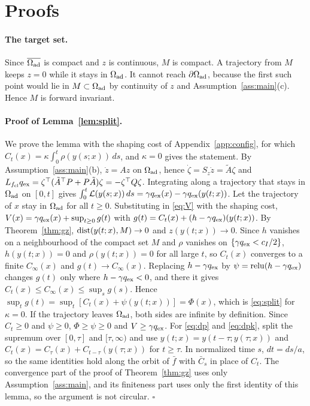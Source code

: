 \section{Proofs}\label{app:proofs}

\paragraph{The target set.} Since $\overline{\Omega_{\mathrm{ad}}}$ is compact and $z$ is continuous, $M$ is compact. A trajectory from $M$ keeps $z=0$ while it stays in $\Omega_{\mathrm{ad}}$. It cannot reach $\partial\Omega_{\mathrm{ad}}$, because the first such point would lie in $M\subset\Omega_{\mathrm{ad}}$ by continuity of $z$ and Assumption~\ref{ass:main}(c). Hence $M$ is forward invariant.

\paragraph{Proof of Lemma~\ref{lem:split}.} We prove the lemma with the shaping cost of Appendix~\ref{app:config}, for which $C_t(x)=\kappa\int_0^t\rho(y(s;x))\,ds$, and $\kappa=0$ gives the statement. By Assumption~\ref{ass:main}(b), $\dot z=Az$ on $\Omega_{\mathrm{ad}}$, hence $\dot\zeta=S_z\dot z=\tilde A\zeta$ and $L_{f_{\mathrm{cl}}}q_{\mathrm{ex}}=\zeta^\top(\tilde A^\top P+P\tilde A)\zeta=-\zeta^\top Q\zeta$. Integrating along a trajectory that stays in $\Omega_{\mathrm{ad}}$ on $[0,t]$ gives $\int_0^t\mathcal L(y(s;x))\,ds=\gamma q_{\mathrm{ex}}(x)-\gamma q_{\mathrm{ex}}(y(t;x))$. Let the trajectory of $x$ stay in $\Omega_{\mathrm{ad}}$ for all $t\ge0$. Substituting in \eqref{eq:V} with the shaping cost, $V(x)=\gamma q_{\mathrm{ex}}(x)+\sup_{t\ge0}g(t)$ with $g(t)=C_t(x)+(h-\gamma q_{\mathrm{ex}})(y(t;x))$. By Theorem~\ref{thm:gz}, $\operatorname{dist}(y(t;x),M)\to0$ and $z(y(t;x))\to0$. Since $h$ vanishes on a neighbourhood of the compact set $M$ and $\rho$ vanishes on $\{\gamma q_{\mathrm{ex}}<c_I/2\}$, $h(y(t;x))=0$ and $\rho(y(t;x))=0$ for all large $t$, so $C_t(x)$ converges to a finite $C_\infty(x)$ and $g(t)\to C_\infty(x)$. Replacing $h-\gamma q_{\mathrm{ex}}$ by $\psi=\operatorname{relu}(h-\gamma q_{\mathrm{ex}})$ changes $g(t)$ only where $h-\gamma q_{\mathrm{ex}}<0$, and there it gives $C_t(x)\le C_\infty(x)\le\sup_sg(s)$. Hence $\sup_tg(t)=\sup_t[C_t(x)+\psi(y(t;x))]=\Phi(x)$, which is \eqref{eq:split} for $\kappa=0$. If the trajectory leaves $\Omega_{\mathrm{ad}}$, both sides are infinite by definition. Since $C_t\ge0$ and $\psi\ge0$, $\Phi\ge\psi\ge0$ and $V\ge\gamma q_{\mathrm{ex}}$. For \eqref{eq:dp} and \eqref{eq:dpk}, split the supremum over $[0,\tau]$ and $[\tau,\infty)$ and use $y(t;x)=y(t-\tau;y(\tau;x))$ and $C_t(x)=C_\tau(x)+C_{t-\tau}(y(\tau;x))$ for $t\ge\tau$. In normalized time $s$, $dt=ds/a$, so the same identities hold along the orbit of $\bar f$ with $\bar C_s$ in place of $C_t$. The convergence part of the proof of Theorem~\ref{thm:gz} uses only Assumption~\ref{ass:main}, and its finiteness part uses only the first identity of this lemma, so the argument is not circular. \hfill$\square$

